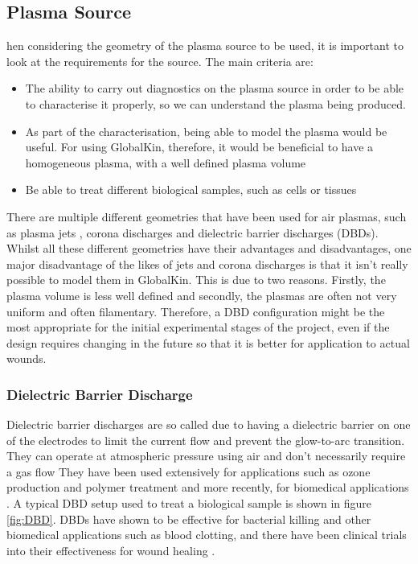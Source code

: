 \documentclass[11pt, oneside]{article}   	%
\begin{document}
\subsection{Plasma Source}
hen considering the geometry of the plasma source to be used, it is important to look at the requirements for the source.
The main criteria are:
\begin{itemize}
\item The ability to carry out diagnostics on the plasma source in order to be able to characterise it properly, so we can understand the plasma being produced. 
\item As part of the characterisation, being able to model the plasma would be useful. For using GlobalKin, therefore, it would be beneficial to have a homogeneous plasma, with a well defined plasma volume
\item Be able to treat different biological samples, such as cells or tissues
\end{itemize}

There are multiple different geometries that have been used for air plasmas, such as plasma jets \cite{Pei2012inactivation, Chen2009blood, Walsh2011portable}, corona discharges \cite{Dobrynin2011inactivation} and dielectric barrier discharges (DBDs).
Whilst all these different geometries have their advantages and disadvantages, one major disadvantage of the likes of jets and corona discharges is that it isn't really possible to model them in GlobalKin.
This is due to two reasons.
Firstly, the plasma volume is less well defined and secondly, the plasmas are often not very uniform and often filamentary.
Therefore, a DBD configuration might be the most appropriate for the initial experimental stages of the project, even if the design requires changing in the future so that it is better for application to actual wounds.


\subsubsection{Dielectric Barrier Discharge}
Dielectric barrier discharges are so called due to having a dielectric barrier on one of the electrodes to limit the current flow and prevent the glow-to-arc transition. 
They can operate at atmospheric pressure using air and don't necessarily require a gas flow \cite{Fridman2013plasmamedicine}
They have been used extensively for applications such as ozone production and polymer treatment and more recently, for biomedical applications \cite{Fridman2013plasmamedicine, Brehmer2015alleviation}.
A typical DBD setup used to treat a biological sample is shown in figure \ref{fig:DBD}.
DBDs have shown to be effective for bacterial killing and other biomedical applications such as blood clotting, and there have been clinical trials into their effectiveness for wound healing \cite{Daeschlein2012in, Fridman2006blood, Brehmer2015alleviation}. 
\end{document}
